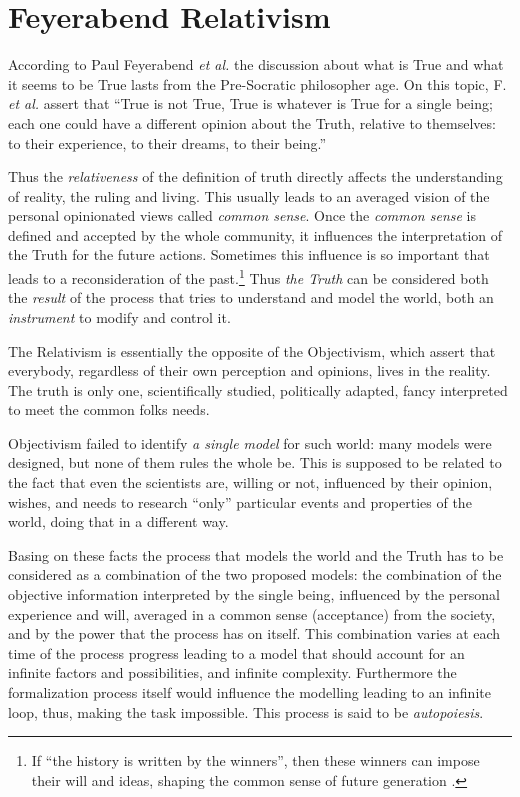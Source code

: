 \section{Feyerabend Relativism}

According to Paul Feyerabend \textit{\textit{et al.}} \cite{PF} the discussion about what is True
and what it seems to be True lasts from the Pre-Socratic philosopher age.
On this topic, F. \textit{\textit{et al.}} assert that ``True is not True, True is whatever is True for
a single being; each one could have a different opinion about the Truth, relative
to themselves: to their experience, to their dreams, to their being.''

Thus the \textit{relativeness} of the definition of truth directly affects the
understanding of reality, the ruling and living. This usually  leads to
an averaged vision of the personal opinionated views called \textit{common sense}.
Once the \textit{common sense} is defined and accepted by the whole community,
it influences the interpretation of the Truth for the future actions.
Sometimes this influence is so important that leads to a reconsideration of the
past.\footnote{If ``the history is written by the winners'', then these winners can impose their will and ideas, shaping the common sense of future generation
.}
Thus \textit{the Truth} can be considered both the \textit{result} of the
process that tries to understand and model the world, both an
\textit{instrument} to modify and control it.

The Relativism is essentially the opposite of the Objectivism, which assert that
everybody, regardless of their own perception and opinions, lives in the reality.
The truth is only one, scientifically studied, politically adapted, fancy
interpreted to meet the common folks needs\cite{PF}.

Objectivism failed to identify \textit{a single model} for such world: many models were designed, but none of them rules the whole be.
This is supposed to be related to the fact that even the scientists are, willing
or not, influenced by their opinion, wishes, and needs to research ``only'' particular events and properties of the world, doing that in a different way.

Basing on these facts the process that models the world and the Truth has to be considered as
a combination of the two proposed models: the combination of the objective
information interpreted by the single being, influenced by the personal
experience and will, averaged in a common sense (acceptance) from the society,
and by the power that the process has on itself.
This combination varies at each time of the process progress leading to
a model that should account for an infinite factors and possibilities,
and infinite complexity. Furthermore  the formalization process itself would influence
the modelling leading to an infinite loop, thus, making the task impossible.
This process is said to be \textit{autopoiesis}.

